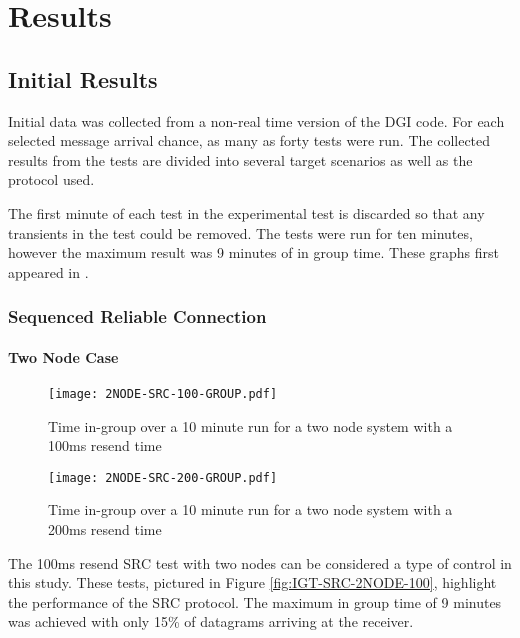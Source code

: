 \chapter{Results}

\section{Initial Results}

Initial data was collected from a non-real time version of the DGI code.
For each selected message arrival chance, as many as forty tests were run.
The collected results from the tests are divided into several target scenarios as well as the protocol used.

The first minute of each test in the experimental test is discarded so that any transients in the test could be removed.
The tests were run for ten minutes, however the maximum result was 9 minutes of in group time.
These graphs first appeared in \cite{CRITIS2012}.

\subsection{Sequenced Reliable Connection}

\subsubsection{Two Node Case}

\begin{figure}
\centering
\begin{minipage}{0.45\textwidth}
    \centering
    \texttt{[image: 2NODE-SRC-100-GROUP.pdf]}
    \caption{Time in-group over a 10 minute run for a two node system with a 100ms resend time}
    \label{fig:IGT-SRC-2NODE-100}
\end{minipage}%
\qquad
\begin{minipage}{0.45\textwidth}
    \centering
    \texttt{[image: 2NODE-SRC-200-GROUP.pdf]}
    \caption{Time in-group over a 10 minute run for a two node system with a 200ms resend time}
    \label{fig:IGT-SRC-2NODE-200}
\end{minipage}
\end{figure}

The 100ms resend SRC test with two nodes can be considered a type of control in this study.
These tests, pictured in Figure \ref{fig:IGT-SRC-2NODE-100}, highlight the performance of the SRC protocol.
The maximum in group time of 9 minutes was achieved with only 15\% of datagrams arriving at the receiver. 


